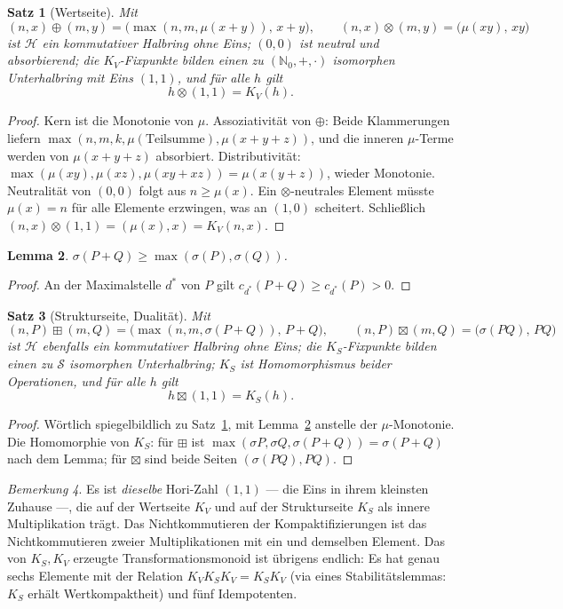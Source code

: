 \documentclass[11pt]{article}
\newtheorem{satz}{Satz}[section]
\newtheorem{lemma}[satz]{Lemma}
\theoremstyle{definition}
\theoremstyle{remark}
\newtheorem{bemerkung}[satz]{Bemerkung}
\newcommand{\Hori}{\mathcal H}
\newcommand{\Struk}{\mathcal S}
\newcommand{\NN}{\mathbb N_0}
\newcommand{\KV}{K_V}
\newcommand{\KS}{K_S}
\begin{document}
\begin{satz}[Wertseite]\label{satz:wertseite}
Mit
\[
(n,x)\oplus(m,y)=\bigl(\max(n,m,\mu(x{+}y)),\,x{+}y\bigr),
\qquad
(n,x)\otimes(m,y)=\bigl(\mu(xy),\,xy\bigr)
\]
ist $\Hori$ ein kommutativer Halbring ohne Eins; $(0,0)$ ist neutral
und absorbierend; die $\KV$-Fixpunkte bilden einen zu
$(\NN,+,\cdot)$ isomorphen Unterhalbring mit Eins $(1,1)$, und für
alle $h$ gilt
\[
h\otimes(1,1)=\KV(h).
\]
\end{satz}

\begin{proof}
Kern ist die Monotonie von $\mu$. Assoziativität von $\oplus$: Beide
Klammerungen liefern
$\max(n,m,k,\mu(\text{Teilsumme}),\mu(x{+}y{+}z))$, und die inneren
$\mu$-Terme werden von $\mu(x{+}y{+}z)$ absorbiert. Distributivität:
$\max(\mu(xy),\mu(xz),\mu(xy{+}xz))=\mu(x(y{+}z))$, wieder Monotonie.
Neutralität von $(0,0)$ folgt aus $n\ge\mu(x)$. Ein
$\otimes$-neutrales Element müsste $\mu(x)=n$ für alle Elemente
erzwingen, was an $(1,0)$ scheitert. Schließlich
$(n,x)\otimes(1,1)=(\mu(x),x)=\KV(n,x)$.
\end{proof}

\begin{lemma}\label{lem:sigmamono}
$\sigma(P+Q)\ge\max(\sigma(P),\sigma(Q))$.
\end{lemma}

\begin{proof}
An der Maximalstelle $d^*$ von $P$ gilt
$c_{d^*}(P{+}Q)\ge c_{d^*}(P)>0$.
\end{proof}

\begin{satz}[Strukturseite, Dualität]\label{satz:dualitaet}
Mit
\[
(n,P)\boxplus(m,Q)=\bigl(\max(n,m,\sigma(P{+}Q)),\,P{+}Q\bigr),
\qquad
(n,P)\boxtimes(m,Q)=\bigl(\sigma(PQ),\,PQ\bigr)
\]
ist $\Hori$ ebenfalls ein kommutativer Halbring ohne Eins; die
$\KS$-Fixpunkte bilden einen zu $\Struk$ isomorphen Unterhalbring;
$\KS$ ist Homomorphismus beider Operationen, und für alle $h$ gilt
\[
h\boxtimes(1,1)=\KS(h).
\]
\end{satz}

\begin{proof}
Wörtlich spiegelbildlich zu Satz~\ref{satz:wertseite}, mit
Lemma~\ref{lem:sigmamono} anstelle der $\mu$-Monotonie. Die
Homomorphie von $\KS$: für $\boxplus$ ist
$\max(\sigma P,\sigma Q,\sigma(P{+}Q))=\sigma(P{+}Q)$ nach dem
Lemma; für $\boxtimes$ sind beide Seiten
$(\sigma(PQ),PQ)$.
\end{proof}

\begin{bemerkung}
Es ist \emph{dieselbe} Hori-Zahl $(1,1)$ --- die Eins in ihrem
kleinsten Zuhause ---, die auf der Wertseite $\KV$ und auf der
Strukturseite $\KS$ als innere Multiplikation trägt. Das
Nichtkommutieren der Kompaktifizierungen ist das Nichtkommutieren
zweier Multiplikationen mit ein und demselben Element. Das von
$\KS,\KV$ erzeugte Transformationsmonoid ist übrigens endlich: Es
hat genau sechs Elemente mit der Relation
$\KV\KS\KV=\KS\KV$ (via eines Stabilitätslemmas: $\KS$ erhält
Wertkompaktheit) und fünf Idempotenten.
\end{bemerkung}
\end{document}

